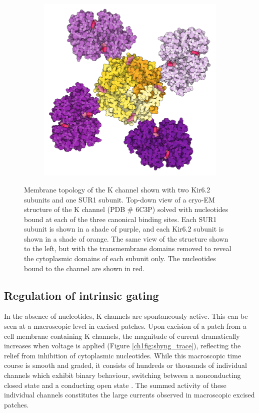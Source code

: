 \begin{figure}[h]
\begin{subfigure}[t]{0.45\textwidth}
		\includegraphics[width=\textwidth]{sur_topdown_ctd_propellor.pdf}
	\end{subfigure}
	\caption[K\ATP{} architecture and nucleotide regulation]{
		 Membrane topology of the K\ATP{} channel shown with two Kir6.2 subunits and one SUR1 subunit.
		 Top-down view of a cryo-EM structure of the K\ATP{} channel (PDB \# 6C3P) solved with nucleotides bound at each of the three canonical binding sites.
		Each SUR1 subunit is shown in a shade of purple, and each Kir6.2 subunit is shown in a shade of orange.
		 The same view of the structure shown to the left, but with the transmembrane domains removed to reveal the cytoplasmic domains of each subunit only.
		The nucleotides bound to the channel are shown in red.
	}
\end{figure}

\subsection{Regulation of intrinsic gating}

In the absence of nucleotides, K\ATP{} channels are spontaneously active.
This can be seen at a macroscopic level in excised patches.
Upon excision of a patch from a cell membrane containing K\ATP{} channels, the magnitude of current dramatically increases when voltage is applied (Figure \ref{ch1fig:shyng_trace}), reflecting the relief from inhibition of cytoplasmic nucleotides.
While this macroscopic time course is smooth and graded, it consists of hundreds or thousands of individual channels which exhibit binary behaviour, switching between a nonconducting closed state and a conducting open state \cite{hille_ion_2001}.
The summed activity of these individual channels constitutes the large currents observed in macroscopic excised patches.

